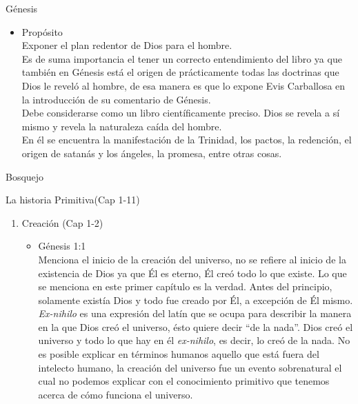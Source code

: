 \begin{section}{Génesis}
\begin{itemize}
		\item Propósito\\
		Exponer el plan redentor de Dios para el hombre.\\
		Es de suma importancia el tener un correcto entendimiento del libro ya que también en Génesis está el origen de 			prácticamente todas las doctrinas que Dios le reveló al hombre, de esa manera es que lo expone Evis Carballosa en la 			introducción de su comentario de Génesis.\\
		Debe considerarse como un libro científicamente preciso. Dios se revela a sí mismo y revela la naturaleza caída del 			hombre.\\
		En él se encuentra la manifestación de la Trinidad, los pactos, la redención, el origen de satanás y los ángeles, la 			promesa, entre otras cosas.
	\end{itemize}
	\begin{subsection}{Bosquejo}
		\begin{subsubsection}{La historia Primitiva(Cap 1-11)}
			\begin{enumerate}
				\item Creación (Cap 1-2)
					\begin{itemize}
\item Génesis 1:1\\
Menciona el inicio de la creación del universo, no se refiere al inicio de la existencia de Dios ya que Él es eterno, Él creó todo lo que existe. Lo que se menciona en este primer capítulo es la verdad. Antes del principio, solamente existía Dios y todo fue creado por Él, a excepción de Él mismo.\newpage
\textit{Ex-nihilo} es una expresión del latín que se ocupa para describir la manera en la que Dios creó el universo, ésto quiere decir ``de la nada''. Dios creó el universo y todo lo que hay en él \textit{ex-nihilo}, es decir, lo creó de la nada. No es posible explicar en términos humanos aquello que está fuera del intelecto humano, la creación del universo fue un evento sobrenatural el cual no podemos explicar con el conocimiento primitivo que tenemos acerca de cómo funciona el universo.\\

\end{itemize}
\end{enumerate}
\end{subsubsection}
\end{subsection}
\end{section}
